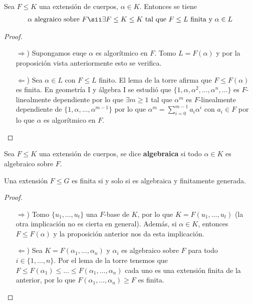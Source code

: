 \begin{prop}
    Sea $F\leq K$ una extensión de cuerpos, $\alpha \in K$. Entonces se tiene
    \begin{gather*}
        \alpha \text{ alegraico sobre } F \sii \exists F\leq K\leq K \text{ tal que } F\leq L \text{ finita y }\alpha \in L
    \end{gather*}

    \begin{proof}\
        \begin{itemize}
            \item[$\Rightarrow$)] Supongamos euqe $\alpha$ es algorítmico en $F$. Tomo $L=F(\alpha)$ y por la proposición vista anteriormente esto se verifica.
            \item[$\Leftarrow$)] Sea $\alpha\in L$ con $F\leq L$ finito. El lema de la torre afirma que $F\leq F(\alpha)$ es finita. En geometría I y álgebra I se estudió que $\{1, \alpha, \alpha^2, \dots, \alpha^n, \dots\}$ es $F$-linealmente dependiente por lo que $\exists m \geq 1$ tal que $\alpha^m$ es $F$-linealmente dependiente de $\{1, \alpha, \dots, \alpha^{m-1}\}$ por lo que $\alpha^m = \sum\limits_{i=0}^{m-1} a_i\alpha^i$ con $a_i\in F$ por lo que $\alpha$ es algorítmico en $F$.
        \end{itemize}
    \end{proof}
\end{prop}

\begin{definicion}
    Sea $F\leq K$ una extensión de cuerpos, se dice \textbf{algebraica} si todo $\alpha\in K$ es algebraico sobre $F$.
\end{definicion}

\begin{teo}
    Una extensión $F\leq G$ es finita si y solo si es algebraica y finitamente generada.
    \begin{proof}\
        \begin{itemize}
            \item[$\Rightarrow$)] Tomo $\{u_1, \dots, u_t\}$ una $F$-base de $K$, por lo que $K=F(u_1, \dots, u_t)$ (la otra implicación no es cierta en general). Además, si $\alpha\in K$, entonces $F\leq F(\alpha)$ y la proposición anterior nos da esta implicación.
            \item[$\Leftarrow$)] Sea $K=F(\alpha_1, \dots, \alpha_n)$ y $\alpha_i$ es algebraico sobre $F$ para todo $i\in \{1,\dots,n\}$. Por el lema de la torre tenemos que $F\leq F(\alpha_1)\leq \dots\leq F(\alpha_1, \dots, \alpha_n)$ cada uno es una extensión finita de la anterior, por lo que $F(\alpha_1, \dots, \alpha_n)\geq F$ es finita.
        \end{itemize}
    \end{proof}
\end{teo}

